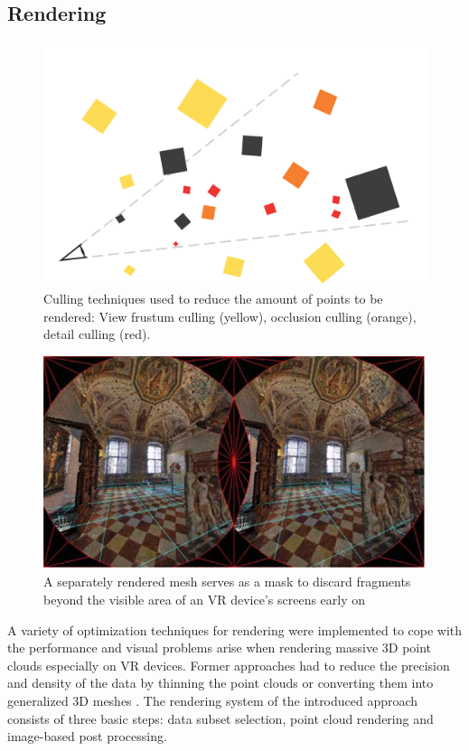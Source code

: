 \documentclass[10pt,twocolumn,letterpaper]{article}
\begin{document}
\subsection{Rendering}
\begin{figure}
		\includegraphics{pointcloud_2.png}
	\caption{Culling techniques used to reduce the amount
of points to be rendered: View frustum culling (yellow),
occlusion culling (orange), detail culling (red).}
	\label{fig:pointcloud_2}
\end{figure}
\begin{figure}
		\includegraphics{pointcloud_3.png}
	\caption{A separately rendered mesh serves as a mask to discard fragments beyond the visible area of an VR device’s screens early on}
	\label{fig:pointcloud_3}
\end{figure}
A variety of optimization techniques for rendering were implemented to cope with the performance and visual problems arise when rendering massive 3D point clouds especially on VR devices. Former approaches had to reduce the precision and density of the data by thinning the point clouds \cite{kreylos2008immersive} or converting them into generalized 3D meshes \cite{berger2017survey}. The rendering system of the introduced approach consists of three basic steps: data subset selection, point cloud rendering and image-based post processing.
\end{document}
